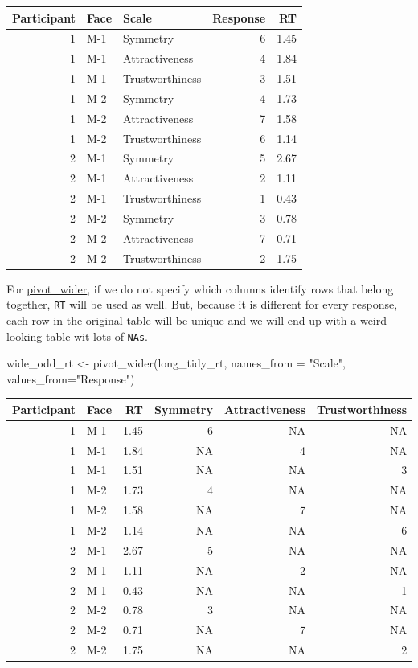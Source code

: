 \documentclass[
]{book}
\newenvironment{Shaded}{\begin{snugshade}}{\end{snugshade}}
\newcommand{\AttributeTok}[1]{\textcolor[rgb]{0.77,0.63,0.00}{#1}}
\newcommand{\FunctionTok}[1]{\textcolor[rgb]{0.00,0.00,0.00}{#1}}
\newcommand{\NormalTok}[1]{#1}
\newcommand{\OtherTok}[1]{\textcolor[rgb]{0.56,0.35,0.01}{#1}}
\newcommand{\StringTok}[1]{\textcolor[rgb]{0.31,0.60,0.02}{#1}}
\begin{document}
\begin{tabular}{r|l|l|r|r}
\hline
Participant & Face & Scale & Response & RT\\
\hline
1 & M-1 & Symmetry & 6 & 1.45\\
\hline
1 & M-1 & Attractiveness & 4 & 1.84\\
\hline
1 & M-1 & Trustworthiness & 3 & 1.51\\
\hline
1 & M-2 & Symmetry & 4 & 1.73\\
\hline
1 & M-2 & Attractiveness & 7 & 1.58\\
\hline
1 & M-2 & Trustworthiness & 6 & 1.14\\
\hline
2 & M-1 & Symmetry & 5 & 2.67\\
\hline
2 & M-1 & Attractiveness & 2 & 1.11\\
\hline
2 & M-1 & Trustworthiness & 1 & 0.43\\
\hline
2 & M-2 & Symmetry & 3 & 0.78\\
\hline
2 & M-2 & Attractiveness & 7 & 0.71\\
\hline
2 & M-2 & Trustworthiness & 2 & 1.75\\
\hline
\end{tabular}

For \href{https://tidyr.tidyverse.org/reference/pivot_wider.html}{pivot\_wider}, if we do not specify which columns identify rows that belong together, \texttt{RT} will be used as well. But, because it is different for every response, each row in the original table will be unique and we will end up with a weird looking table wit lots of \texttt{NAs}.

\begin{Shaded}
\begin{Highlighting}[]
\NormalTok{wide\_odd\_rt }\OtherTok{\textless{}{-}}
  \FunctionTok{pivot\_wider}\NormalTok{(long\_tidy\_rt, }\AttributeTok{names\_from =} \StringTok{"Scale"}\NormalTok{, }\AttributeTok{values\_from=}\StringTok{"Response"}\NormalTok{)}
\end{Highlighting}
\end{Shaded}

\begin{tabular}{r|l|r|r|r|r}
\hline
Participant & Face & RT & Symmetry & Attractiveness & Trustworthiness\\
\hline
1 & M-1 & 1.45 & 6 & NA & NA\\
\hline
1 & M-1 & 1.84 & NA & 4 & NA\\
\hline
1 & M-1 & 1.51 & NA & NA & 3\\
\hline
1 & M-2 & 1.73 & 4 & NA & NA\\
\hline
1 & M-2 & 1.58 & NA & 7 & NA\\
\hline
1 & M-2 & 1.14 & NA & NA & 6\\
\hline
2 & M-1 & 2.67 & 5 & NA & NA\\
\hline
2 & M-1 & 1.11 & NA & 2 & NA\\
\hline
2 & M-1 & 0.43 & NA & NA & 1\\
\hline
2 & M-2 & 0.78 & 3 & NA & NA\\
\hline
2 & M-2 & 0.71 & NA & 7 & NA\\
\hline
2 & M-2 & 1.75 & NA & NA & 2\\
\hline
\end{tabular}
\end{document}
